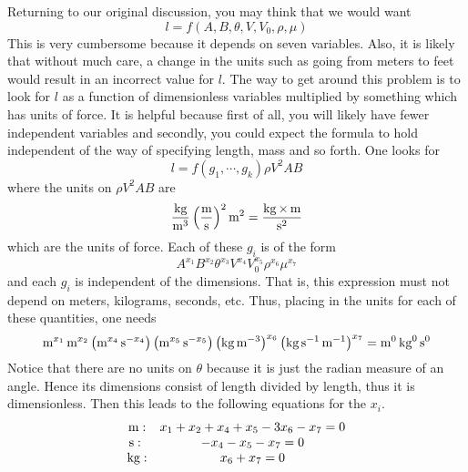 Returning to our original discussion, you may think that we would want 
\begin{equation*}
l=f\left( A,B,\theta ,V,V_{0},\rho ,\mu \right) 
\end{equation*}
This is very cumbersome because it depends on seven variables. Also, it is likely that without much care,
a change in the units such as going from meters to feet would result in an
incorrect value for $l$. The way to get around this problem is to look for $l
$ as a function of dimensionless variables multiplied by something which has
units of force. It is helpful because first of all, you will likely have
fewer independent variables and secondly, you could expect the formula to
hold independent of the way of specifying length, mass and so forth. One
looks for 
\begin{equation*}
l=f\left( g_{1},\cdots ,g_{k}\right) \rho V^{2}AB
\end{equation*}
where the units on $\rho V^{2}AB$ are 
\begin{equation*}
\frac{\kg}{\m^{3}}\left( \frac{\m}{\s }\right) ^{2}\m^{2}=\frac{\kg\times \m}{%
\s ^{2}}
\end{equation*}
which are the units of force. Each of these $g_{i}$ is of the form 
\begin{equation}
A^{x_{1}}B^{x_{2}}\theta ^{x_{3}}V^{x_{4}}V_{0}^{x_{5}}\rho ^{x_{6}}\mu
^{x_{7}}  \label{11julye1f}
\end{equation}
and each $g_{i}$ is independent of the dimensions. That is, this expression
must not depend on meters, kilograms, seconds, etc. Thus, placing in the
units for each of these quantities, one needs 
\begin{equation*}
\mathop{\textrm{m}}\nolimits^{x_{1}}\mathop{\textrm{m}}\nolimits^{x_{2}}\left( \mathop{\textrm{m}}\nolimits^{x_{4}}\mathop{\textrm{s}}\nolimits ^{-x_{4}}\right) \left( \mathop{\textrm{m}}\nolimits^{x_{5}}\mathop{\textrm{s}}\nolimits
^{-x_{5}}\right) \left( \mathop{\textrm{kg}}\nolimits\mathop{\textrm{m}}\nolimits^{-3}\right) ^{x_{6}}\left( \mathop{\textrm{kg}}\nolimits\mathop{\textrm{s}}\nolimits
^{-1}\mathop{\textrm{m}}\nolimits^{-1}\right) ^{x_{7}}=\mathop{\textrm{m}}\nolimits^{0}\mathop{\textrm{kg}}\nolimits^{0}\mathop{\textrm{s}}\nolimits ^{0}
\end{equation*}
Notice that there are no units on $\theta $ because it is just the radian
measure of an angle. Hence its dimensions consist of length divided by
length, thus it is dimensionless. Then this leads to the following equations
for the $x_{i}.$
\begin{equation*}
\begin{array}{cc}
\m: & x_{1}+x_{2}+x_{4}+x_{5}-3x_{6}-x_{7}=0 \\ 
\s :\  & -x_{4}-x_{5}-x_{7}=0 \\ 
\kg: & x_{6}+x_{7}=0%
\end{array}
\end{equation*}

